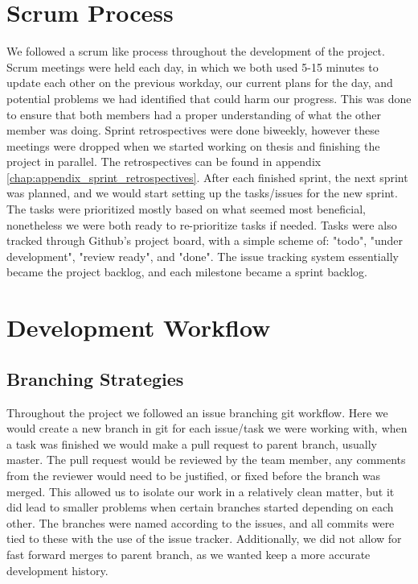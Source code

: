 \section{Scrum Process}
We followed a scrum like process throughout the development of the project.
Scrum meetings were held each day, in which we both used 5-15 minutes to update each
other on the previous workday, our current plans for the day, and potential
problems we had identified that could harm our progress.
This was done to ensure that both members had a proper understanding of what the other
member was doing.
Sprint retrospectives were done biweekly, however these meetings were dropped when
we started working on thesis and finishing the project in parallel.
The retrospectives can be found in appendix \ref{chap:appendix_sprint_retrospectives}.
After each finished sprint, the next sprint was planned, and we would start setting
up the tasks/issues for the new sprint.
The tasks were prioritized mostly based on what seemed most beneficial, nonetheless we were both
ready to re-prioritize tasks if needed.
Tasks were also tracked through Github's project board, with a simple scheme of: "todo",
"under development", "review ready", and "done".
The issue tracking system essentially became the project backlog, and
each milestone became a sprint backlog.

\section{Development Workflow}
\subsection{Branching Strategies}
Throughout the project we followed an issue branching git workflow.
Here we would create a new branch in git for each issue/task we were working with,
when a task was finished we would make a pull request to parent branch, usually master.
The pull request would be reviewed by the team member, any comments from the reviewer
would need to be justified, or fixed before the branch was merged.
This allowed us to isolate our work in a relatively clean matter, but
it did lead to smaller problems when certain branches started depending on each other.
The branches were named according to the issues, and all commits were tied to these
with the use of the issue tracker.
Additionally, we did not allow for fast forward merges to parent branch, as we wanted
keep a more accurate development history.

